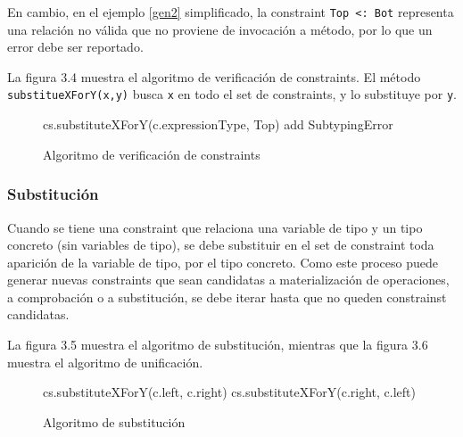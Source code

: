 En cambio, en el ejemplo \ref{gen2} simplificado, la constraint \texttt{Top <: Bot} representa una relación no válida que no proviene de invocación a método, por lo que un error debe ser reportado.

La figura 3.4 muestra el algoritmo de verificación de constraints. El método \texttt{substitueXForY(x,y)} busca \texttt{x} en todo el set de constraints, y lo substituye por \texttt{y}.

\begin{figure}[ht]
  \centering
  \label{pseudocheck}
  \begin{mdframed}
    \begin{algorithmic}
              \State cs.substituteXForY(c.expressionType, Top)
            \EndIf
              \State add SubtypingError
            \EndIf
          \EndFor
      \EndFunction
    \end{algorithmic}
  \end{mdframed}
  \caption{Algoritmo de verificación de constraints}
\end{figure}


\subsubsection{Substitución}
Cuando se tiene una constraint que relaciona una variable de tipo y un tipo concreto (sin variables de tipo), se debe substituir en el set de constraint toda aparición de la variable de tipo, por el tipo concreto. Como este proceso puede generar nuevas constraints que sean candidatas a materialización de operaciones, a comprobación o a substitución, se debe iterar hasta que no queden constrainst candidatas.

La figura 3.5 muestra el algoritmo de substitución, mientras que la figura 3.6 muestra el algoritmo de unificación.

\begin{figure}[ht]
  \centering
  \label{pseudosubst}
  \begin{mdframed}
    \begin{algorithmic}
              \State cs.substituteXForY(c.left, c.right)
            \EndIf
              \State cs.substituteXForY(c.right, c.left)
            \EndIf
          \EndFor
      \EndFunction
    \end{algorithmic}
  \end{mdframed}
  \caption{Algoritmo de substitución}
\end{figure}


